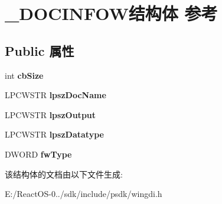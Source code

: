 \hypertarget{struct___d_o_c_i_n_f_o_w}{}\section{\+\_\+\+D\+O\+C\+I\+N\+F\+O\+W结构体 参考}
\label{struct___d_o_c_i_n_f_o_w}
\subsection*{Public 属性}
\begin{DoxyCompactItemize}
\item 
\mbox{\label{struct___d_o_c_i_n_f_o_w_a7a10ee3aea8c381dc495d9541659f19d}} 
int {\bfseries cb\+Size}
\item 
\mbox{\label{struct___d_o_c_i_n_f_o_w_a72fc50f05c23c81e6f1373b3b33c6a64}} 
L\+P\+C\+W\+S\+TR {\bfseries lpsz\+Doc\+Name}
\item 
\mbox{\label{struct___d_o_c_i_n_f_o_w_ac8526b28d05e50b1cfc8477caf2ce9fa}} 
L\+P\+C\+W\+S\+TR {\bfseries lpsz\+Output}
\item 
\mbox{\label{struct___d_o_c_i_n_f_o_w_aff9d162d14323787e7ea3dfe6d6c13ce}} 
L\+P\+C\+W\+S\+TR {\bfseries lpsz\+Datatype}
\item 
\mbox{\label{struct___d_o_c_i_n_f_o_w_a86ac4263e1fbc761f36a67bfc87686a9}} 
D\+W\+O\+RD {\bfseries fw\+Type}
\end{DoxyCompactItemize}


该结构体的文档由以下文件生成\+:\begin{DoxyCompactItemize}
\item 
E\+:/\+React\+O\+S-\/0../sdk/include/psdk/wingdi.\+h\end{DoxyCompactItemize}
